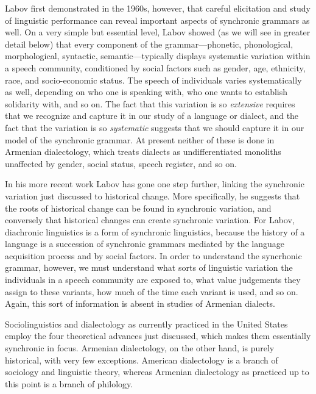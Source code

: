 Labov first demonstrated in the 1960s, however, that careful elicitation and study of linguistic performance can reveal important aspects of synchronic grammars as well. On a very simple but essential level, Labov showed (as we will see in greater detail below) that every component of the grammar—phonetic, phonological, morphological, syntactic, semantic—typically displays systematic variation within a speech community, conditioned by social factors such as gender, age, ethnicity, race, and socio-economic status. The speech of individuals varies systematically as well, depending on who one is speaking with, who one wants to establish solidarity with, and so on. The fact that this variation is so \textit{extensive} requires that we recognize and capture it in our study of a language or dialect, and the fact that the variation is so \textit{systematic} suggests that we should capture it in our model of the synchronic grammar. At present neither of these is done in Armenian dialectology, which treats dialects as undifferentiated monoliths unaffected by gender, social status, speech register, and so on.


In his more recent work Labov has gone one step further, linking the synchronic variation just discussed to historical change. More specifically, he suggests that the roots of historical change can be found in synchronic variation, and conversely that historical changes can create synchronic variation. For Labov, diachronic linguistics is a form of synchronic linguistics, because the history of a language is a succession of synchronic grammars mediated by the language acquisition process and by social factors. In order to understand the syncrhonic grammar, however, we must understand what sorts of linguistic variation the individuals in a speech community are exposed to, what value judgements they assign to these variants, how much of the time each variant is used, and so on. Again, this sort of information is absent in studies of Armenian dialects.

Sociolinguistics and dialectology as currently practiced in the United States employ the four theoretical advances just discussed, which makes them essentially synchronic in focus. Armenian dialectology, on the other hand, is purely historical, with very few exceptions. American dialectology is a branch of sociology and linguistic theory, whereas Armenian dialectology as practiced up to this point is a branch of philology.

